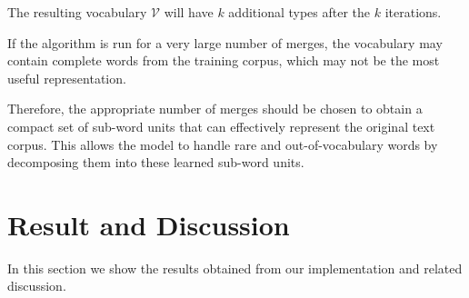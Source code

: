 The resulting vocabulary $\mathcal{V}$ will have $k$ additional types after the $k$ iterations.

If the algorithm is run for a very large number of merges, the vocabulary may contain complete words from the training corpus, which may not be the most useful representation.

Therefore, the appropriate number of merges should be chosen to obtain a compact set of sub-word units that can effectively represent the original text corpus. This allows the model to handle rare and out-of-vocabulary words by decomposing them into these learned sub-word units.
\section{Result and Discussion}
In this section we show the results obtained from our implementation and related discussion.
